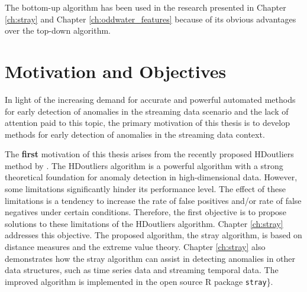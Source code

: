 \documentclass{monashthesis}
\theoremstyle{definition}
\theoremstyle{definition}
\theoremstyle{definition}
\theoremstyle{remark}
\begin{document}
The bottom-up algorithm has been used in the research presented in Chapter \ref{ch:stray} and Chapter \ref{ch:oddwater_features} because of its obvious advantages over the top-down algorithm.

\hypertarget{motivation-and-objectives}{%
\section{Motivation and Objectives}\label{motivation-and-objectives}}

\label{sec:motivation}

In light of the increasing demand for accurate and powerful automated methods for early detection of anomalies in the streaming data scenario and the lack of attention paid to this topic, the primary motivation of this thesis is to develop methods for early detection of anomalies in the streaming data context.

The \textbf{first} motivation of this thesis arises from the recently proposed HDoutliers method by \textcite{wilkinsonvisualizing}. The HDoutliers algorithm is a powerful algorithm with a strong theoretical foundation for anomaly detection in high-dimensional data. However, some limitations significantly hinder its performance level. The effect of these limitations is a tendency to increase the rate of false positives and/or rate of false negatives under certain conditions. Therefore, the first objective is to propose solutions to these limitations of the HDoutliers algorithm. Chapter \ref{ch:stray} addresses this objective. The proposed algorithm, the stray algorithm, is based on distance measures and the extreme value theory. Chapter \ref{ch:stray} also demonstrates how the stray algorithm can assist in detecting anomalies in other data structures, such as time series data and streaming temporal data. The improved algorithm is implemented in the open source R package \texttt{stray}\}.
\end{document}
